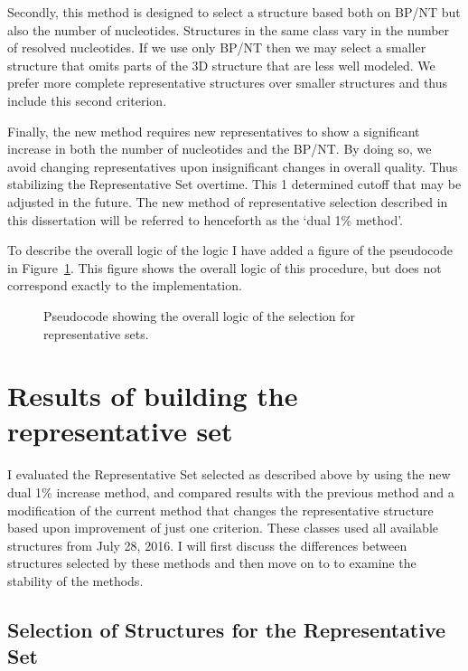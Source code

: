 Secondly, this method is designed to select a structure based both on BP/NT but
also the number of nucleotides. Structures in the same class vary in the number
of resolved nucleotides. If we use only BP/NT then we may select a  smaller
structure that omits parts of the 3D structure that are less well modeled. We
prefer more complete representative structures over smaller structures and thus
include this second criterion.

Finally, the new method requires new representatives to show a significant
increase in both the number of nucleotides and the BP/NT. By doing so, we avoid
changing representatives upon insignificant changes in overall quality. Thus
stabilizing the Representative Set overtime. This 1%
determined cutoff that may be adjusted in the future. The new method of
representative selection described in this dissertation will be referred to
henceforth as the ‘dual 1\% method’.

To describe the overall logic of the logic I have added a figure of the
pseudocode in Figure~\ref{fig:pseudocode-representatives}. This figure shows the
overall logic of this procedure, but does not correspond exactly to the
implementation.

\begin{figure}
  \caption{Pseudocode showing the overall logic of the selection for
  representative sets.}
  \label{fig:pseudocode-representatives}
\end{figure}

\section{Results of building the representative set}

I evaluated the Representative Set selected as described above by using the new
dual 1\% increase method, and compared results with the previous method and a
modification of the current method that changes the representative structure
based upon improvement of just one criterion. These classes used all available
structures from July 28, 2016. I will first discuss the differences between
structures selected by these methods and then move on to to examine the
stability of the methods.

\subsection{Selection of Structures for the Representative Set}

